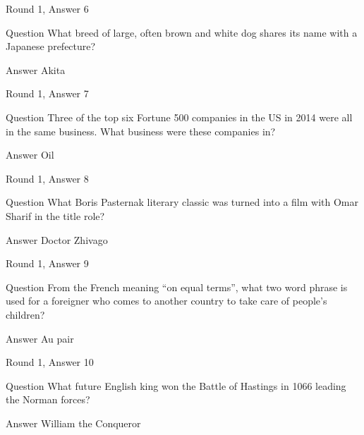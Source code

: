\documentclass[11pt]{beamer}
\begin{document}
\begin{frame}[t]{Round 1, Answer 6}
\vspace{2em}
\begin{block}{Question}
What breed of large, often brown and white dog shares its name with a Japanese prefecture\@?
\end{block}
\pause{}
\begin{block}{Answer}
Akita
\end{block}
\end{frame}
    

\begin{frame}[t]{Round 1, Answer 7}
\vspace{2em}
\begin{block}{Question}
Three of the top six Fortune 500 companies in the US in 2014 were all in the same business. What business were these companies in\@?
\end{block}
\pause{}
\begin{block}{Answer}
Oil
\end{block}
\end{frame}
    

\begin{frame}[t]{Round 1, Answer 8}
\vspace{2em}
\begin{block}{Question}
What Boris Pasternak literary classic was turned into a film with Omar Sharif in the title role\@?
\end{block}
\pause{}
\begin{block}{Answer}
Doctor Zhivago
\end{block}
\end{frame}
    

\begin{frame}[t]{Round 1, Answer 9}
\vspace{2em}
\begin{block}{Question}
From the French meaning ``on equal terms'', what two word phrase is used for a foreigner who comes to another country to take care of people's children\@?
\end{block}
\pause{}
\begin{block}{Answer}
Au pair
\end{block}
\end{frame}
    

\begin{frame}[t]{Round 1, Answer 10}
\vspace{2em}
\begin{block}{Question}
What future English king won the Battle of Hastings in 1066 leading the Norman forces\@?
\end{block}
\pause{}
\begin{block}{Answer}
William the Conqueror
\end{block}
\end{frame}
    
\end{document}
